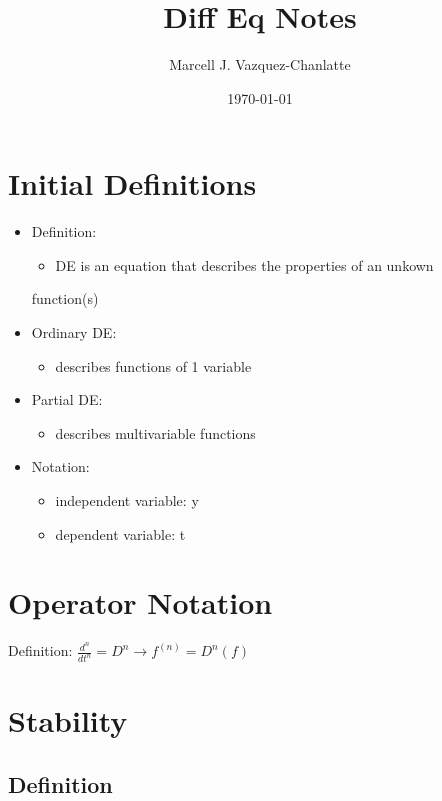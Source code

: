 \documentclass[11pt]{article}
\title{Diff Eq Notes}
\author{Marcell J. Vazquez-Chanlatte}
\date{\today}
\begin{document}
\maketitle

\setcounter{tocdepth}{3}
\tableofcontents
\vspace*{1cm}


\section{Initial Definitions}
\label{sec-1}

\begin{itemize}
\item Definition:
\begin{itemize}
\item DE is an equation that describes the properties of an unkown
\end{itemize}
function(s)
\item Ordinary DE:
\begin{itemize}
\item describes functions of 1 variable
\end{itemize}
\item Partial DE:
\begin{itemize}
\item describes multivariable functions
\end{itemize}
\item Notation:
\begin{itemize}
\item independent variable: y
\item dependent variable: t
\end{itemize}
\end{itemize}
\section{Operator Notation}
\label{sec-2}

  Definition:
  $\frac{d^n}{dt^n} = D^n \rightarrow f^{(n)} = D^n(f)$
\section{Stability}
\label{sec-3}
\subsection{Definition}
\label{sec-3-1}
\end{document}
